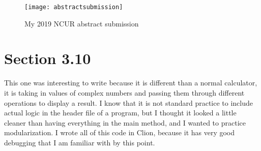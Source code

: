 \documentclass[11pt]{article}
\begin{document}
\begin{figure}[h!]
    \centering
    \texttt{[image: abstractsubmission]}
    \caption{My 2019 NCUR abstract submission}
    \label{fig:my_label}
\end{figure}

\section*{Section 3.10}
This one was interesting to write because it is different than a normal calculator, it is taking in values of complex numbers and passing them through different operations to display a result. I know that it is not standard practice to include actual logic in the header file of a program, but I thought it looked a little cleaner than having everything in the main method, and I wanted to practice modularization. I wrote all of this code in Clion, because it has very good debugging that I am familiar with by this point. 
\end{document}
